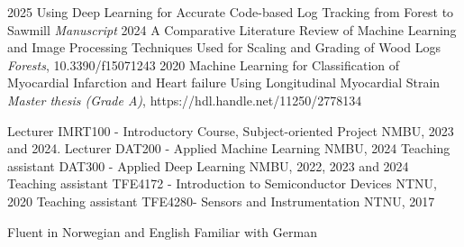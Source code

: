

\begin{cvSmallExps}
    \cvSmallExp
        {2025} %
        {Using Deep Learning for Accurate Code-based Log Tracking from Forest to Sawmill} %
        {\textit{Manuscript}} %
    \cvSmallExp
        {2024} %
        {A Comparative Literature Review of Machine Learning and Image Processing Techniques Used for Scaling and Grading of Wood Logs} %
        {\textit{Forests}, 10.3390/f15071243} %
    \cvSmallExp
        {2020} %
        {Machine Learning for Classification of Myocardial Infarction and Heart failure Using Longitudinal Myocardial Strain} %
        {\textit{Master thesis (Grade A)}, https://hdl.handle.net/11250/2778134} %
\end{cvSmallExps}

\vspace{1em} %


\begin{cvSmallExps}
    \cvSmallExp
        {Lecturer} %
        {IMRT100 - Introductory Course, Subject-oriented Project} %
        {NMBU, 2023 and 2024.} %
    \cvSmallExp
        {Lecturer} %
        {DAT200 - Applied Machine Learning} %
        {NMBU, 2024} %
    \cvSmallExp
        {Teaching assistant} %
        {DAT300 - Applied Deep Learning} %
        {NMBU, 2022, 2023 and 2024} %
    \cvSmallExp
        {Teaching assistant} %
        {TFE4172 - Introduction to Semiconductor Devices} %
        {NTNU, 2020} %
    \cvSmallExp
        {Teaching assistant} %
        {TFE4280- Sensors and Instrumentation} %
        {NTNU, 2017} %
\end{cvSmallExps}

\vspace{1em} %


\begin{cvSmallExps}
    \cvSmallExp
        {Fluent in}
        {Norwegian and English}
        {} 
    \cvSmallExp
        {Familiar with}
        {German}
        {}
\end{cvSmallExps}

